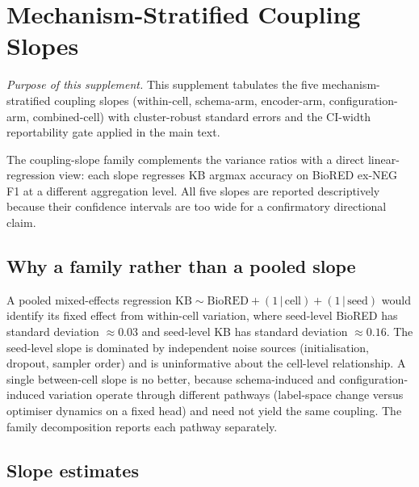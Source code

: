 \section{Mechanism-Stratified Coupling Slopes}
\label{supp:slopes}

\textit{Purpose of this supplement.}\;
This supplement tabulates the five mechanism-stratified coupling
slopes (within-cell, schema-arm, encoder-arm, configuration-arm,
combined-cell) with cluster-robust standard errors and the
CI-width reportability gate applied in the main text.

The coupling-slope family complements the variance ratios with a
direct linear-regression view: each slope regresses
KB argmax accuracy on BioRED ex-NEG F1 at a different aggregation
level. All five slopes are reported descriptively because their
confidence intervals are too wide for a confirmatory directional
claim.

\subsection{Why a family rather than a pooled slope}

A pooled mixed-effects regression $\text{KB} \sim \text{BioRED} +
(1\,|\,\text{cell}) + (1\,|\,\text{seed})$ would identify its fixed
effect from within-cell variation, where seed-level BioRED has
standard deviation $\approx 0.03$ and seed-level KB has standard
deviation $\approx 0.16$. The seed-level slope is dominated by
independent noise sources (initialisation, dropout, sampler order)
and is uninformative about the cell-level relationship. A single
between-cell slope is no better, because schema-induced and
configuration-induced variation operate through different pathways
(label-space change versus optimiser dynamics on a fixed head) and
need not yield the same coupling. The family decomposition reports
each pathway separately.

\subsection{Slope estimates}

